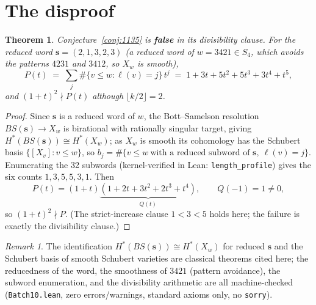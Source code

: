 \documentclass[11pt]{article}
\newtheorem{theorem}{Theorem}[section]
\theoremstyle{definition}
\theoremstyle{remark}
\newtheorem*{remark}{Remark}
\begin{document}
\section{The disproof}
\begin{theorem}\label{thm:1135}
Conjecture~\ref{conj:1135} is \textbf{false} in its divisibility clause. For the reduced word $\mathbf{s} = (2,1,3,2,3)$ (a reduced word of $w = 3421 \in S_4$, which avoids the patterns $4231$ and $3412$, so $X_w$ is smooth),
\[
P(t) \;=\; \sum_j \#\{v \le w : \ell(v) = j\}\, t^j \;=\; 1 + 3t + 5t^2 + 5t^3 + 3t^4 + t^5,
\]
and $(1+t)^2 \nmid P(t)$ although $\lfloor k/2 \rfloor = 2$.
\end{theorem}
\begin{proof}
Since $\mathbf{s}$ is a reduced word of $w$, the Bott--Samelson resolution $BS(\mathbf{s}) \to X_w$ is birational with rationally singular target, giving $H^*(BS(\mathbf{s})) \cong H^*(X_w)$; as $X_w$ is smooth its cohomology has the Schubert basis $\{[X_v] : v \le w\}$, so $b_j = \#\{v \le w\ \text{with a reduced subword of } \mathbf{s},\ \ell(v) = j\}$. Enumerating the 32 subwords (kernel-verified in Lean: \texttt{length\_profile}) gives the six counts $1,3,5,5,3,1$. Then
\[
P(t) = (1+t)\underbrace{(1+2t+3t^2+2t^3+t^4)}_{Q(t)}, \qquad Q(-1) = 1 \ne 0,
\]
so $(1+t)^2 \nmid P$. (The strict-increase clause $1 < 3 < 5$ holds here; the failure is exactly the divisibility clause.)
\end{proof}
\begin{remark}
The identification $H^*(BS(\mathbf{s})) \cong H^*(X_w)$ for reduced $\mathbf{s}$ and the Schubert basis of smooth Schubert varieties are classical theorems cited here; the reducedness of the word, the smoothness of $3421$ (pattern avoidance), the subword enumeration, and the divisibility arithmetic are all machine-checked (\texttt{Batch10.lean}, zero errors/warnings, standard axioms only, no \texttt{sorry}).
\end{remark}
\end{document}
